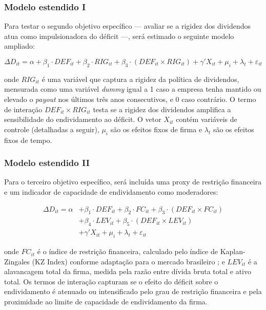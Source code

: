 \documentclass[a4paper,12pt]{article}
\begin{document}
\subsubsection{Modelo estendido I}
 
Para testar o segundo objetivo específico — avaliar se a rigidez dos dividendos atua como impulsionadora do déficit —, será estimado o seguinte modelo ampliado:
 
\begin{equation}
    \Delta D_{it} = \alpha + \beta_1 \cdot DEF_{it} + \beta_2 \cdot RIG_{it} + \beta_3 \cdot (DEF_{it} \times RIG_{it}) + \gamma' X_{it} + \mu_i + \lambda_t + \varepsilon_{it}
    \label{eq:modelo_div}
\end{equation}
 
\noindent onde $RIG_{it}$ é uma variável que captura a rigidez da política de dividendos, mensurada como uma variável \textit{dummy} igual a 1 caso a empresa tenha mantido ou elevado o \textit{payout} nos últimos três anos consecutivos, e 0 caso contrário. O termo de interação $DEF_{it} \times RIG_{it}$ testa se a rigidez dos dividendos amplifica a sensibilidade do endividamento ao déficit. O vetor $X_{it}$ contém variáveis de controle (detalhadas a seguir), $\mu_i$ são os efeitos fixos de firma e $\lambda_t$ são os efeitos fixos de tempo.
 
\subsubsection{Modelo estendido II}
 
Para o terceiro objetivo específico, será incluída uma proxy de restrição financeira e um indicador de capacidade de endividamento como moderadores:
 
\begin{equation}
\begin{split}
    \Delta D_{it} = \alpha & + \beta_1 \cdot DEF_{it} + \beta_2 \cdot FC_{it} + \beta_3 \cdot (DEF_{it} \times FC_{it}) \\
    & + \beta_4 \cdot LEV_{it} + \beta_5 \cdot (DEF_{it} \times LEV_{it}) \\
    & + \gamma' X_{it} + \mu_i + \lambda_t + \varepsilon_{it}
\end{split}
\label{eq:modelo_fc}
\end{equation}
 
\noindent onde $FC_{it}$ é o índice de restrição financeira, calculado pelo índice de Kaplan-Zingales (KZ Index) conforme adaptação para o mercado brasileiro \cite{Yildirim2021}; e $LEV_{it}$ é a alavancagem total da firma, medida pela razão entre dívida bruta total e ativo total. Os termos de interação capturam se o efeito do déficit sobre o endividamento é atenuado ou intensificado pelo grau de restrição financeira e pela proximidade ao limite de capacidade de endividamento da firma.
 
\end{document}
